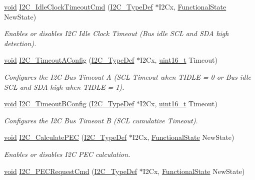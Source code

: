 \begin{DoxyCompactItemize}
\hyperlink{group___n_a_m_e_ga18028b8badbf1ea7e704ccac3c488e82}{void} \hyperlink{group___i2_c___group3_ga234146a106e974f8def8b8b723477d1a}{I2\-C\-\_\-\-Idle\-Clock\-Timeout\-Cmd} (\hyperlink{struct_i2_c___type_def}{I2\-C\-\_\-\-Type\-Def} $\ast$I2\-Cx, \hyperlink{group___exported__types_gac9a7e9a35d2513ec15c3b537aaa4fba1}{Functional\-State} New\-State)
\begin{DoxyCompactList}\small\item\em Enables or disables I2\-C Idle Clock Timeout (Bus idle S\-C\-L and S\-D\-A high detection). \end{DoxyCompactList}\item 
\hyperlink{group___n_a_m_e_ga18028b8badbf1ea7e704ccac3c488e82}{void} \hyperlink{group___i2_c___group3_ga26c32f66b0e362aab18df3b7246a8518}{I2\-C\-\_\-\-Timeout\-A\-Config} (\hyperlink{struct_i2_c___type_def}{I2\-C\-\_\-\-Type\-Def} $\ast$I2\-Cx, \hyperlink{stdint_8h_a273cf69d639a59973b6019625df33e30}{uint16\-\_\-t} Timeout)
\begin{DoxyCompactList}\small\item\em Configures the I2\-C Bus Timeout A (S\-C\-L Timeout when T\-I\-D\-L\-E = 0 or Bus idle S\-C\-L and S\-D\-A high when T\-I\-D\-L\-E = 1). \end{DoxyCompactList}\item 
\hyperlink{group___n_a_m_e_ga18028b8badbf1ea7e704ccac3c488e82}{void} \hyperlink{group___i2_c___group3_ga3e7ba63f7a71c12ea3ec0badb2cd5a50}{I2\-C\-\_\-\-Timeout\-B\-Config} (\hyperlink{struct_i2_c___type_def}{I2\-C\-\_\-\-Type\-Def} $\ast$I2\-Cx, \hyperlink{stdint_8h_a273cf69d639a59973b6019625df33e30}{uint16\-\_\-t} Timeout)
\begin{DoxyCompactList}\small\item\em Configures the I2\-C Bus Timeout B (S\-C\-L cumulative Timeout). \end{DoxyCompactList}\item 
\hyperlink{group___n_a_m_e_ga18028b8badbf1ea7e704ccac3c488e82}{void} \hyperlink{group___i2_c___group3_gae86801251359226c35745e0a258388b0}{I2\-C\-\_\-\-Calculate\-P\-E\-C} (\hyperlink{struct_i2_c___type_def}{I2\-C\-\_\-\-Type\-Def} $\ast$I2\-Cx, \hyperlink{group___exported__types_gac9a7e9a35d2513ec15c3b537aaa4fba1}{Functional\-State} New\-State)
\begin{DoxyCompactList}\small\item\em Enables or disables I2\-C P\-E\-C calculation. \end{DoxyCompactList}\item 
\hyperlink{group___n_a_m_e_ga18028b8badbf1ea7e704ccac3c488e82}{void} \hyperlink{group___i2_c___group3_ga6dadf895935eb068e1ec378637fd0ef9}{I2\-C\-\_\-\-P\-E\-C\-Request\-Cmd} (\hyperlink{struct_i2_c___type_def}{I2\-C\-\_\-\-Type\-Def} $\ast$I2\-Cx, \hyperlink{group___exported__types_gac9a7e9a35d2513ec15c3b537aaa4fba1}{Functional\-State} New\-State)

\end{DoxyCompactItemize}
